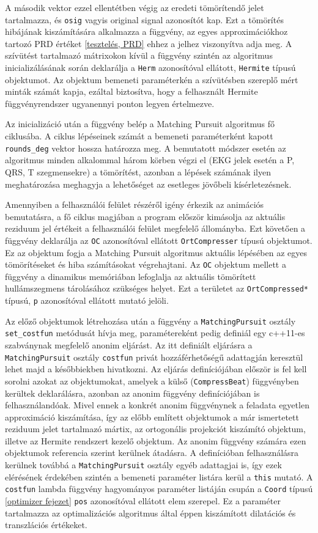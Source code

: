 \documentclass[oneside,titlepage,12pt,a4paper]{report}
\begin{document}
A második vektor ezzel ellentétben végig az eredeti tömörítendő jelet tartalmazza, és \texttt{osig} vagyis original signal azonosítót kap. Ezt
a tömörítés hibájának kiszámítására alkalmazza a függvény, az egyes approximációkhoz tartozó PRD értéket \ref{tesztelés, PRD} ehhez a jelhez
viszonyítva adja meg. A szívütést tartalmazó mátrixokon kívül a függvény szintén az algoritmus inicializálásának során deklarálja a \texttt{Herm} azonosítóval ellátott, \texttt{Hermite} típusú objektumot. Az objektum bemeneti paraméterkén a szívütésben szereplő mért minták számát kapja, ezáltal biztosítva, hogy a felhasznált Hermite függvényrendszer ugyanennyi ponton legyen értelmezve. 
\par Az inicializáció után a függvény belép a Matching Pursuit algoritmus fő ciklusába. A ciklus lépéseinek számát a bemeneti paraméterként kapott \texttt{rounds\_deg} vektor hossza határozza meg. A bemutatott módszer esetén az algoritmus minden alkalommal három körben végzi el (EKG jelek esetén a P, QRS, T szegmensekre) a tömörítést, azonban a lépések számának ilyen meghatározása meghagyja a lehetőséget az esetleges jövőbeli kísérletezésnek. 
\par Amennyiben a felhasználói felület részéről igény érkezik az animációs bemutatásra, a fő ciklus magjában a program  először kimásolja az aktuális reziduum jel értékeit a felhasználói felület megfelelő állományba. Ezt követően a függvény deklarálja az \texttt{OC} azonosítóval ellátott \texttt{OrtCompresser} típusú objektumot. Ez az objektum fogja a Matching Pursuit algoritmus aktuális lépésében az egyes tömörítéseket és hiba számításokat végrehajtani. Az \texttt{OC} objektum mellett a függvény a dinamikus memóriában lefoglalja az aktuális tömörített hullámszegmens tárolásához szükséges helyet. Ezt a területet az \texttt{OrtCompressed*} típusú, \texttt{p} azonosítóval ellátott mutató jelöli. 
\par Az előző objektumok létrehozása után a függvény a \texttt{MatchingPursuit} osztály \texttt{set\_costfun} metódusát hívja meg, paramétereként pedig definiál egy c++11-es szabványnak megfelelő anonim eljárást. Az itt definiált eljárásra a \texttt{MatchingPursuit} osztály \texttt{costfun} privát hozzáférhetőségű adattagján keresztül lehet majd a későbbiekben hivatkozni. Az eljárás definíciójában először is fel kell sorolni azokat az objektumokat, amelyek a külső (\texttt{CompressBeat}) függvényben kerültek deklarálásra, azonban az anonim függvény definíciójában is felhasználandóak. Mivel ennek a konkrét anonim függvénynek a feladata egyetlen approximáció kiszámítása, így az előbb említett objektumok a már ismertetett reziduum jelet tartalmazó mártix, az ortogonális projekciót kiszámító objektum, illetve az Hermite rendszert kezelő objektum. Az anonim függvény számára ezen objektumok referencia szerint kerülnek átadásra. A definícióban felhasználásra kerülnek továbbá a \texttt{MatchingPursuit} osztály egyéb adattagjai is, így ezek elérésének érdekében szintén a bemeneti paraméter listára kerül a \texttt{this} mutató. A \texttt{costfun} lambda függvény hagyományos paraméter listáján csupán a \texttt{Coord} típusú \ref{optimizer fejezet} \texttt{pos} azonosítóval ellátott elem szerepel. Ez a paraméter tartalmazza az optimalizációs algoritmus által éppen kiszámított dilatációs és transzlációs értékeket. 
\end{document}
